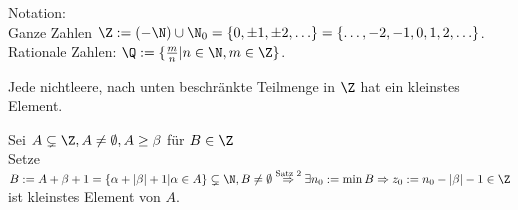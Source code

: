 \documentclass[../ana1.tex]{subfiles}
\begin{document}
Notation:\\
Ganze Zahlen \(\Z := (-\N)\cup \N_0 = \{0, \pm 1, \pm 2, \ldots \} = \{\ldots, -2,-1,0,1,2,\ldots \} \).\\
Rationale Zahlen: \(\Q := \{ \frac{m}{n} \vert n\in\N, m\in\Z \} \).
\begin{kor}
	Jede nichtleere, nach unten beschränkte Teilmenge in \(\Z \) hat ein kleinstes Element.
\end{kor}
\begin{bew}
	Sei \(A\subsetneq \Z, A\neq \emptyset, A\geq \beta \) für \(B\in\Z \) \\
	Setze \(B:= A+\beta +1 =\{\alpha+|\beta|+1\vert \alpha\in A\}\subsetneq \N, B\neq \emptyset \\
		\overset{\text{Satz 2}}{\Rightarrow} \exists n_0:= \min B \Rightarrow z_0 := n_0 - |\beta|-1\in\Z \) ist kleinstes Element von \(A\).
\end{bew}
\end{document}
